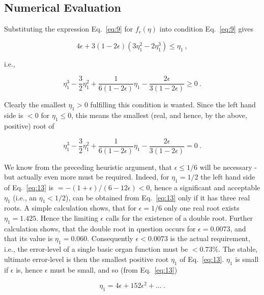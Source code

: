 \documentclass[twocolumn,preprintnumbers,amsmath,amssymb,floatfix]{revtex4}
\begin{document}
\subsection{\label{sec:eight4}Numerical Evaluation}

Substituting the expression Eq.~\ref{eq:9} for $f_\epsilon(\eta)$
into condition Eq.~\ref{eq:9} gives

\begin{equation*}
4\epsilon+3(1-2\epsilon)(3\eta_1^2-2\eta_1^3)\leq\eta_1~,
\end{equation*}

\noindent i.e.,

\begin{equation*}
\eta_1^3-\frac{3}{2}\eta_1^2+\frac{1}{6(1-2\epsilon)}\eta_1-\frac{2\epsilon}{3(1-2\epsilon)}\geq0~.
\end{equation*}

\noindent Clearly the smallest $\eta_1>0$ fulfilling this
condition is wanted. Since the left hand side is $<0$ for
$\eta_1\leq0$, this means the smallest (real, and hence, by the
above, positive) root of

\begin{equation}
\eta_1^3-\frac{3}{2}\eta_1^2+\frac{1}{6(1-2\epsilon)}\eta_1-\frac{2\epsilon}{3(1-2\epsilon)}=0~.
\label{eq:13}
\end{equation}

\noindent We know from the preceding heuristic argument, that
$\epsilon\leq1/6$ will be necessary - but actually even more must
be required. Indeed, for $\eta_1=1/2$ the left hand side of
Eq.~\ref{eq:13} is $=-(1+\epsilon)/(6-12\epsilon)<0$, hence a
significant and acceptable $\eta_1$ (i.e., an $\eta_1<1/2$), can
be obtained from Eq.~\ref{eq:13} only if it has three real roots.
A simple calculation shows, that for $\epsilon=1/6$ only one real
root exists $\eta_1=1.425$. Hence the limiting $\epsilon$ calls
for the existence of a double root. Further calculation shows,
that the double root in question occurs for $\epsilon=0.0073$, and
that its value is $\eta_1=0.060$. Consequently $\epsilon < 0.0073$
is the actual requirement, i.e., the error-level of a single basic
organ function must be $< 0.73\%$. The stable, ultimate
error-level is then the smallest positive root $\eta_1$ of
Eq.~\ref{eq:13}. $\eta_1$ is small if $\epsilon$ is, hence
$\epsilon$ must be small, and so (from Eq.~\ref{eq:13})

\begin{equation*}
\eta_1=4\epsilon+152\epsilon^2+\dots~.
\end{equation*}
\end{document}
